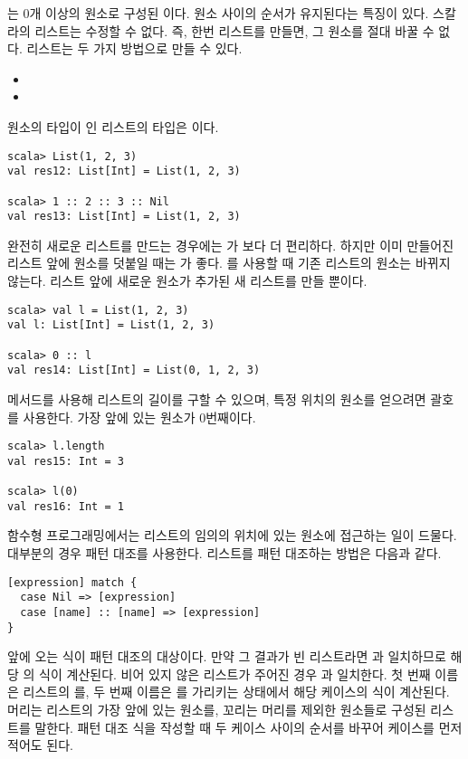 는 0개 이상의 원소로 구성된 이다. 원소 사이의
순서가 유지된다는 특징이 있다. 스칼라의 리스트는 수정할 수 없다. 즉, 한번 리스트를
만들면, 그 원소를 절대 바꿀 수 없다. 리스트는 두 가지 방법으로 만들 수 있다.

\begin{itemize}
  \item {}
  \item {}
\end{itemize}

원소의 타입이 인 리스트의 타입은 이다.

\begin{verbatim}
scala> List(1, 2, 3)
val res12: List[Int] = List(1, 2, 3)

scala> 1 :: 2 :: 3 :: Nil
val res13: List[Int] = List(1, 2, 3)
\end{verbatim}

완전히 새로운 리스트를 만드는 경우에는 가 \code{::}보다 더 편리하다. 하지만
이미 만들어진 리스트 앞에 원소를 덧붙일 때는 \code{::}가 좋다.
\code{::}를 사용할 때 기존 리스트의 원소는 바뀌지 않는다.
리스트 앞에 새로운 원소가 추가된 새 리스트를 만들 뿐이다.

\begin{verbatim}
scala> val l = List(1, 2, 3)
val l: List[Int] = List(1, 2, 3)

scala> 0 :: l
val res14: List[Int] = List(0, 1, 2, 3)
\end{verbatim}

 메서드를 사용해 리스트의 길이를 구할 수 있으며, 특정 위치의 원소를
얻으려면 괄호를 사용한다. 가장 앞에 있는 원소가 0번째이다.

\begin{verbatim}
scala> l.length
val res15: Int = 3

scala> l(0)
val res16: Int = 1
\end{verbatim}

함수형 프로그래밍에서는 리스트의 임의의 위치에 있는 원소에 접근하는 일이 드물다.
대부분의 경우 패턴 대조를 사용한다. 리스트를 패턴 대조하는 방법은 다음과 같다.

\begin{verbatim}
[expression] match {
  case Nil => [expression]
  case [name] :: [name] => [expression]
}
\end{verbatim}

 앞에 오는 식이 패턴 대조의 대상이다. 만약 그 결과가 빈 리스트라면
과
일치하므로 해당 의 식이 계산된다. 비어 있지 않은 리스트가 주어진
경우 과 일치한다. 첫 번째 이름은 리스트의
를, 두 번째 이름은 를
가리키는 상태에서 해당 케이스의 식이 계산된다. 머리는
리스트의 가장 앞에 있는 원소를, 꼬리는 머리를 제외한 원소들로 구성된 리스트를
말한다. 패턴 대조 식을 작성할 때 두 케이스 사이의 순서를 바꾸어 \code{::} 케이스를 먼저
적어도 된다.

